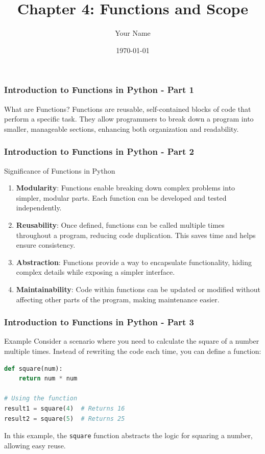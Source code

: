 \documentclass{beamer}
\title{Chapter 4: Functions and Scope}
\author{Your Name}
\institute{Your Institution}
\date{\today}
\begin{document}
\frame{\titlepage}

\begin{frame}[fragile]
    \frametitle{Introduction to Functions in Python - Part 1}
    \begin{block}{What are Functions?}
        Functions are reusable, self-contained blocks of code that perform a specific task. They allow programmers to break down a program into smaller, manageable sections, enhancing both organization and readability.
    \end{block}
\end{frame}

\begin{frame}[fragile]
    \frametitle{Introduction to Functions in Python - Part 2}
    \begin{block}{Significance of Functions in Python}
        \begin{enumerate}
            \item \textbf{Modularity}: Functions enable breaking down complex problems into simpler, modular parts. Each function can be developed and tested independently.
            \item \textbf{Reusability}: Once defined, functions can be called multiple times throughout a program, reducing code duplication. This saves time and helps ensure consistency.
            \item \textbf{Abstraction}: Functions provide a way to encapsulate functionality, hiding complex details while exposing a simpler interface.
            \item \textbf{Maintainability}: Code within functions can be updated or modified without affecting other parts of the program, making maintenance easier.
        \end{enumerate}
    \end{block}
\end{frame}

\begin{frame}[fragile]
    \frametitle{Introduction to Functions in Python - Part 3}
    \begin{block}{Example}
        Consider a scenario where you need to calculate the square of a number multiple times. Instead of rewriting the code each time, you can define a function:
        \begin{lstlisting}[language=Python]
def square(num):
    return num * num

# Using the function
result1 = square(4)  # Returns 16
result2 = square(5)  # Returns 25
        \end{lstlisting}
        In this example, the \texttt{square} function abstracts the logic for squaring a number, allowing easy reuse.
    \end{block}
\end{frame}
\end{document}
